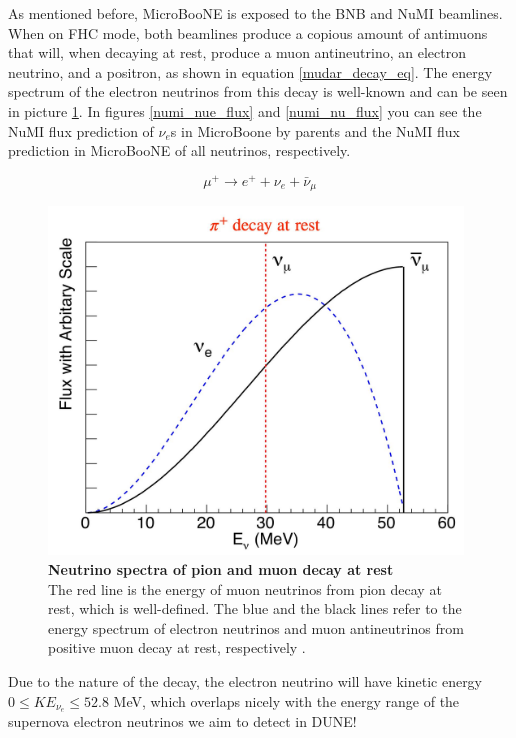 As mentioned before, MicroBooNE is exposed to the BNB and NuMI beamlines. When on FHC mode, both beamlines produce a copious amount of antimuons that will, when decaying at rest, produce a muon antineutrino, an electron neutrino, and a positron, as shown in equation \ref{mudar_decay_eq}. The energy spectrum of the electron neutrinos from this decay is well-known and can be seen in picture \ref{mudar_nue_energy}. In figures \ref{numi_nue_flux} and \ref{numi_nu_flux} you can see the NuMI flux prediction of $\nu_e$s in MicroBoone by parents and the NuMI flux prediction in MicroBooNE of all neutrinos, respectively. 

\begin{equation}
	\mu^{+} \longrightarrow e^{+} + \nu_e + \bar{\nu}_{\mu}
    \label{mudar_decay_eq}
\end{equation}

\begin{figure}[h!]
    \centering
    \includegraphics[width=110mm]{Figures/mudar_nue_energy.jpg}
    \caption[Neutrino spectra of pion and muon decay at rest]{{\textbf{Neutrino spectra of pion and muon decay at rest}}\\ The red line is the energy of muon neutrinos from pion decay at rest, which is well-defined. The blue and the black lines refer to the energy spectrum of electron neutrinos and muon antineutrinos from positive muon decay at rest, respectively \cite{Yang2012}.}
    \label{mudar_nue_energy}
\end{figure}

Due to the nature of the decay, the electron neutrino will have kinetic energy $0 \leqslant KE_{\nu_e} \leqslant 52.8$ MeV, which overlaps nicely with the energy range of the supernova electron neutrinos we aim to detect in DUNE!

